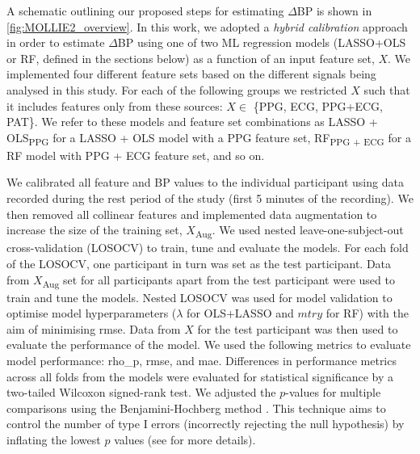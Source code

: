 \documentclass[fleqn,10pt]{wlscirep}
\begin{document}
A schematic outlining our proposed steps for estimating $\Delta$BP is shown in \cref{fig:MOLLIE2_overview}. In this work, we adopted a \textit{hybrid calibration}\cite{Mukkamala2022a} approach in order to estimate $\Delta$BP using one of two ML regression models (LASSO+OLS or RF, defined in the sections below) as a function of an input feature set, $X$. We implemented four different feature sets based on the different signals being analysed in this study. For each of the following groups we restricted $X$ such that it includes features only from these sources: $X \in $ \{PPG, ECG, PPG+ECG, PAT\}. We refer to these models and feature set combinations as LASSO + OLS\textsubscript{PPG} for a LASSO + OLS model with a PPG feature set, RF\textsubscript{PPG + ECG} for a RF model with PPG + ECG feature set, and so on. 

We calibrated all feature and BP values to the individual participant using data recorded during the rest period of the study (first 5 minutes of the recording). We then removed all collinear features and implemented data augmentation to increase the size of the training set, $X$\textsubscript{Aug}. We used nested leave-one-subject-out cross-validation (LOSOCV) to train, tune and evaluate the models. For each fold of the LOSOCV, one participant in turn was set as the test participant. Data from $X$\textsubscript{Aug} set for all participants apart from the test participant were used to train and tune the models. Nested LOSOCV was used for model validation to optimise model hyperparameters ($\lambda$ for OLS+LASSO and $mtry$ for RF) with the aim of minimising \ac{rmse}. Data from $X$ for the test participant was then used to evaluate the performance of the model. We used the following metrics to evaluate model performance: \ac{rho_p}, \ac{rmse}, and \ac{mae}. Differences in performance metrics across all folds from the models were evaluated for statistical significance by a two-tailed Wilcoxon signed-rank test. We adjusted the $p$-values for multiple comparisons using the Benjamini-Hochberg method \cite{Benjamini1995}. This technique aims to control the number of type I errors (incorrectly rejecting the null hypothesis) by inflating the lowest $p$ values (see \cite{Benjamini1995} for more details).
\end{document}
